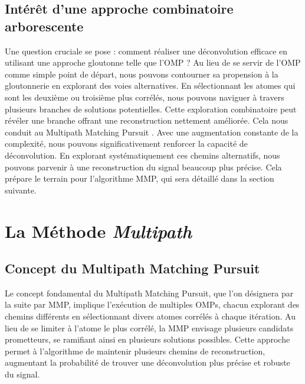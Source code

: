 \documentclass[9pt,a4paper,twoside]{rho}
\begin{document}
\subsection{Intérêt d'une approche combinatoire arborescente}

Une question cruciale se pose : comment réaliser une déconvolution efficace en utilisant une approche gloutonne telle que l'OMP ? 
Au lieu de se servir de l'OMP comme simple point de départ, nous pouvons contourner sa propension à la gloutonnerie en explorant des voies alternatives. 
En sélectionnant les atomes qui sont les deuxième ou troisième plus corrélés, nous pouvons naviguer à travers plusieurs branches de solutions potentielles. 
Cette exploration combinatoire peut révéler une branche offrant une reconstruction nettement améliorée. 
Cela nous conduit au Multipath Matching Pursuit \cite{multipath_matching_pursuit}. Avec une augmentation constante de la complexité, nous pouvons significativement renforcer la capacité de déconvolution. 
En explorant systématiquement ces chemins alternatifs, nous pouvons parvenir à une reconstruction du signal beaucoup plus précise. 
Cela prépare le terrain pour l'algorithme MMP, qui sera détaillé dans la section suivante.

\newpage

\section{La Méthode \textit{Multipath}}

\subsection{Concept du Multipath Matching Pursuit}

Le concept fondamental du Multipath Matching Pursuit, que l'on désignera par la suite par MMP, implique l'exécution de multiples OMPs, chacun explorant des chemins différents en sélectionnant divers atomes corrélés à chaque itération. Au lieu de se limiter à l'atome le plus corrélé, la MMP envisage plusieurs candidats prometteurs, se ramifiant ainsi en plusieurs solutions possibles. Cette approche permet à l'algorithme de maintenir plusieurs chemins de reconstruction, augmentant la probabilité de trouver une déconvolution plus précise et robuste du signal.
\end{document}

